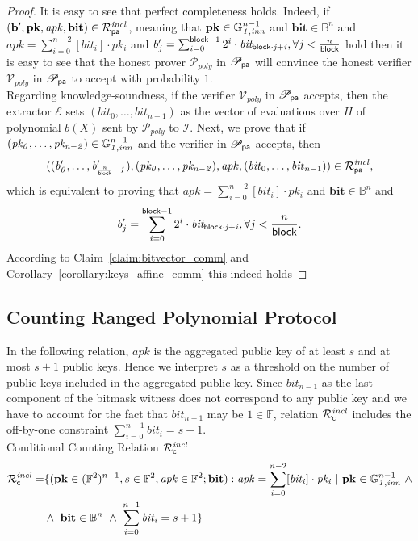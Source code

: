 \begin{proof}
It is easy to see that perfect completeness holds. Indeed, if 
$(\mathbf{b'}, \mathbf{pk}, \mathit{apk}, \mathbf{bit}) \in \mathcal{R}^{\mathit{incl}}_{\mathsf{pa}}$, meaning that 
$\mathbf{pk} \in \mathbb{G}_{\mathit{1,inn}}^{n-1}$ and $\mathbf{bit} \in \mathbb{B}^n$ and $\mathit{apk} = \sum_{i=0}^{n-2} [\mathit{bit_i}] \cdot \mathit{pk_i}$ and 
 $b'_{j} = \sum_{i=0}^{\mathsf{block} -1}2^i \cdot \mathit{bit_{\mathsf{block} \cdot j + i}}, \forall j < \frac{n}{\mathsf{block}}$ 
hold then it is easy to see that the honest prover $\mathcal{P}_{poly}$ in $\mathscr{P}_{\mathsf{pa}}$ will convince the honest 
verifier $\mathcal{V}_{poly}$ in $\mathscr{P}_{\mathsf{pa}}$ to accept with probability $1$.  \\  
Regarding knowledge-soundness, if the verifier $\mathcal{V}_{poly}$ in $\mathscr{P}_{\mathsf{pa}}$ accepts, 
then the extractor $\mathcal{E}$ sets $(\mathit{bit}_0, \ldots, \mathit{bit}_{n-1})$ as the vector of evaluations over $H$ of polynomial $b(X)$ sent by $\mathcal{P}_{poly}$ 
to $\mathcal{I}$. Next, we prove that if $(\mathit{pk_0}, \ldots, \mathit{pk_{n-2}}) \in \mathbb{G}_{\mathit{1,inn}}^{n-1}$ and the verifier in $\mathscr{P}_{\mathsf{pa}}$ accepts, 
then $$((\mathit{b'_{0}}, \ldots, \mathit{b'_{\frac{n}{\mathsf{block}}-1}}), (\mathit{pk_0}, \ldots, \mathit{pk_{n-2}}), \mathit{apk}, (\mathit{bit}_0, \ldots, \mathit{bit}_{n-1})) \in \mathcal{R}^{\mathit{incl}}_{\mathsf{pa}},$$ 
which is equivalent to proving that  $\mathit{apk} = \sum_{i=0}^{n-2} [\mathit{bit_i}] \cdot \mathit{pk_i}$ and 
 $\mathbf{bit} \in \mathbb{B}^n$ and  $$b'_{j} = \sum_{i=0}^{\mathsf{block} -1}2^i \cdot \mathit{bit_{\mathsf{block} \cdot j + i}}, \forall j < \frac{n}{\mathsf{block}}.$$
According to Claim~\ref{claim:bitvector_comm} and Corollary~\ref{corollary:keys_affine_comm} this indeed holds \ewnp
\end{proof}

\subsection{Counting Ranged Polynomial Protocol}
\label{sec_vt}
\noindent In the following relation, $\mathit{apk}$ is the aggregated public key of at least $s$ and at most $s+1$ public keys. 
Hence we interpret $s$ as a threshold on the number of public keys included in the aggregated public key. Since $\mathit{bit_{n-1}}$ as the last component of the 
bitmask witness does not correspond to any public key and we have to account for the fact that $\mathit{bit_{n-1}}$ may be 
$1 \in \mathbb{F}$, relation $\mathcal{R}^{\mathit{incl}}_{\mathsf{c}}$ includes the off-by-one constraint $\sum_{i=0}^{n-1} \mathit{bit_i} = s+1$.\\

\noindent \textsf{Conditional Counting Relation $\mathcal{R}^{\mathit{incl}}_{\mathsf{c}}$}  
\begin{equation*}
\begin{split}
 \Rvt = & \{(\mathbf{pk} \in (\mathbb{F}^2)^{n-1}, s \in \mathbb{F}^2, \mathit{apk} \in \mathbb{F}^2; \mathbf{bit}) : 
 \mathit{apk} = \sum_{i=0}^{n-2} [\mathit{bit_i}]  \cdot \mathit{pk_i} \ | \ \mathbf{pk}  \in \ginn{1}^{n-1} \ \wedge \\ 
& \wedge \ \mathbf{bit} \in \mathbb{B}^n \ \wedge \ \sum_{i=0}^{n-1} \mathit{bit_i} = s+1\} 
\end{split}
\end{equation*}

